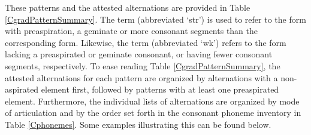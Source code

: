 These patterns and the attested alternations are provided in Table \vref{CgradPatternSummary}. The term  (abbreviated ‘str’) is used to refer to the form with preaspiration, a geminate or more consonant segments than the corresponding form. Likewise, the term  (abbreviated ‘wk’) refers to the form lacking a preaspirated or geminate consonant, or having fewer consonant segments, respectively. 
To ease reading Table \ref{CgradPatternSummary}, the attested alternations for each pattern are organized by alternations with a non-aspirated element first, followed by patterns with at least one preaspirated element. Furthermore, the individual lists of alternations are organized by mode of articulation and by the order set forth in the consonant phoneme inventory in Table \vref{Cphonemes}. 
Some examples illustrating this can be found below. 

